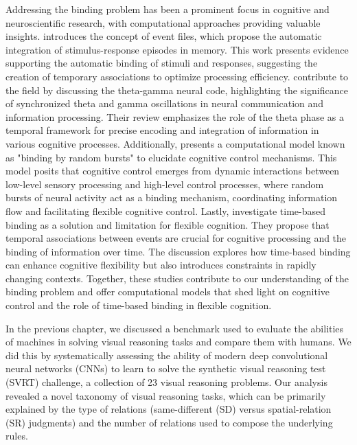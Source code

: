 Addressing the binding problem has been a prominent focus in cognitive and neuroscientific research, with computational approaches providing valuable insights. \citet{hommel1998event} introduces the concept of event files, which propose the automatic integration of stimulus-response episodes in memory. This work presents evidence supporting the automatic binding of stimuli and responses, suggesting the creation of temporary associations to optimize processing efficiency. \citet{lisman2013theta} contribute to the field by discussing the theta-gamma neural code, highlighting the significance of synchronized theta and gamma oscillations in neural communication and information processing. Their review emphasizes the role of the theta phase as a temporal framework for precise encoding and integration of information in various cognitive processes. Additionally, \citet{verguts2017binding} presents a computational model known as "binding by random bursts" to elucidate cognitive control mechanisms. This model posits that cognitive control emerges from dynamic interactions between low-level sensory processing and high-level control processes, where random bursts of neural activity act as a binding mechanism, coordinating information flow and facilitating flexible cognitive control. Lastly, \citet{senoussi2022time} investigate time-based binding as a solution and limitation for flexible cognition. They propose that temporal associations between events are crucial for cognitive processing and the binding of information over time. The discussion explores how time-based binding can enhance cognitive flexibility but also introduces constraints in rapidly changing contexts. Together, these studies contribute to our understanding of the binding problem and offer computational models that shed light on cognitive control and the role of time-based binding in flexible cognition.

In the previous chapter, we discussed a benchmark used to evaluate the abilities of machines in solving visual reasoning tasks and compare them with humans. We did this by systematically assessing the ability of modern deep convolutional neural networks (CNNs) to learn to solve the synthetic visual reasoning test (SVRT) challenge, a collection of 23 visual reasoning problems. Our analysis revealed a novel taxonomy of visual reasoning tasks, which can be primarily explained by the type of relations (same-different (SD) versus spatial-relation (SR) judgments) and the number of relations used to compose the underlying rules.

